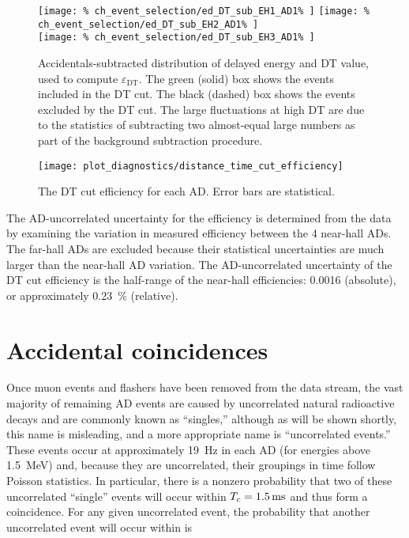 \begin{figure}
    \centering
    \texttt{[image: \%
        ch\_event\_selection/ed\_DT\_sub\_EH1\_AD1\%
    ]}
    \texttt{[image: \%
        ch\_event\_selection/ed\_DT\_sub\_EH2\_AD1\%
    ]} \\
    \texttt{[image: \%
        ch\_event\_selection/ed\_DT\_sub\_EH3\_AD1\%
    ]}
    \caption{
        Accidentals-subtracted distribution of
        delayed energy and DT value, used to compute $\varepsilon_{\text{DT}}$.
        The green (solid) box shows the events included in the DT cut.
        The black (dashed) box shows the events excluded by the DT cut.
        The large fluctuations at high DT are due to the statistics
        of subtracting two almost-equal large numbers as part of the
        background subtraction procedure.
    }
    \label{fig:ed_DT_sub}
\end{figure}

\begin{figure}
    \centering
    \texttt{[image: plot\_diagnostics/distance\_time\_cut\_efficiency]}
    \caption{The DT cut efficiency for each AD. Error bars are statistical.}
    \label{fig:DT_eff}
\end{figure}

The AD-uncorrelated uncertainty for the efficiency
is determined from the data by examining the variation
in measured efficiency between the 4 near-hall ADs.
The far-hall ADs are excluded because
their statistical uncertainties are much larger than the
near-hall AD variation.
The AD-uncorrelated uncertainty of the DT cut efficiency
is the half-range of the near-hall efficiencies: \num{0.0016} (absolute),
or approximately \SI{0.23}{\percent} (relative).

\section{Accidental coincidences}
\label{sec:acc}

Once muon events and flashers have been removed from the data stream,
the vast majority of remaining AD events are caused by uncorrelated
natural radioactive decays and are commonly known as ``singles,''
although as will be shown shortly, this name is misleading,
and a more appropriate name is ``uncorrelated events.''
These events occur at approximately \SI{19}{\hertz} in each AD
(for energies above \SI{1.5}{\MeV})
and,
because they are uncorrelated, their groupings in time follow Poisson statistics.
In particular, there is a nonzero probability that
two of these uncorrelated ``single'' events will occur within
$T_c=\SI{1.5}{\milli\second}$ and thus form a  coincidence.
For any given uncorrelated event, the probability that
another uncorrelated event will occur within \tc{} is

